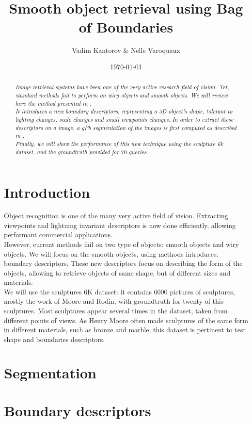 \documentclass{article}
\date{\today}
\title{Smooth object retrieval using Bag of Boundaries}
\author{Vadim Kantorov \& Nelle Varoquaux}
\begin{document}
\maketitle
\begin{abstract}
\textit{Image retrieval systems have been one of the very active research
field of vision. Yet, standard methods fail to perform on wiry objects and
smooth objects. We will review here the method presented in
\cite{Arandjelovic11}.\\
It introduces a new boundary descriptors, representing a 3D object's shape,
tolerant to lighting changes, scale changes and small viewpoints changes. In
order to extract these descriptors on a image, a gPb segmentation of the images
is first computed as described in \cite{gpb}.\\
Finally, we will show the performance of this new technique using the
sculpture 6k dataset, and the groundtruth provided for $70$ queries.}
\end{abstract}

\section{Introduction}
Object recognition is one of the many very active field of vision. Extracting
viewpoints and lightning invariant descriptors is now done efficiently,
allowing performant commercial applications. \\
However, current methods fail on two type of objects: smooth objects and wiry
objects. We will focus on the smooth objects, using methods
\cite{Arandjelovic11} introduces: boundary descriptors. These new descriptors
focus on describing the form of the objects, allowing to retrieve objects
of same shape, but of different sizes and materials. \\
We will use the sculptures 6K dataset: it contains $6000$ pictures of
sculptures, mostly the work of Moore and Rodin, with groundtruth for twenty
of this sculptures. Most sculptures appear several times in the dataset, taken
from different points of views. As Henry Moore often made sculptures of the
same form in different materials, such as bronze and marble, this dataset is
pertinent to test shape and boundaries descriptors.

\section{Segmentation}
\section{Boundary descriptors}
\end{document}
